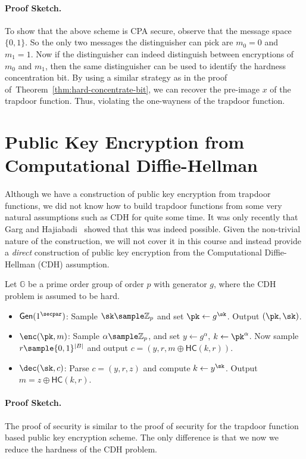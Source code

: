 \paragraph{Proof Sketch.} To show that the above scheme is CPA secure, observe that the message space $\{0,1\}$. So the only two messages the distinguisher can pick are $m_0=0$ and $m_1=1$. Now if the distinguisher can indeed distinguish between encryptions of $m_0$ and $m_1$, then the same distinguisher can be used to identify the hardness concentration bit. By using a similar strategy as in the proof of~Theorem~\ref{thm:hard-concentrate-bit}, we can recover the pre-image $x$ of the trapdoor function. Thus, violating the one-wayness of the trapdoor function.

\section{Public Key Encryption from Computational Diffie-Hellman}
Although we have a construction of public key encryption from trapdoor functions, we did not know how to build trapdoor functions from some very natural assumptions such as CDH for quite some time. It was only recently that Garg and Hajiabadi~\cite{C:GarHaj18} showed that this was indeed possible. Given the non-trivial nature of the construction, we will not cover it in this course and instead provide a \emph{direct} construction of public key encryption from the Computational Diffie-Hellman (CDH) assumption.

Let $\mathbb{G}$ be a prime order group of order $p$ with generator $g$, where the CDH problem is assumed to be hard.
\begin{itemize}
    \item $\gen(1^\secpar)$: Sample $\sk \sample \mathbb{Z}_p$ and set $\pk \gets g^\sk$. Output $(\pk, \sk)$.
    \item $\enc(\pk, m)$: Sample $\alpha \sample \mathbb{Z}_p$, and set $y \gets g^\alpha$, $k \gets \pk^\alpha$. Now sample $r \sample \{0,1\}^{|B|}$ and output $c = (y, r, m \oplus \mathsf{HC}(k, r))$.
    \item $\dec(\sk, c)$: Parse $c = (y, r, z)$ and compute $k \gets y^\sk$. Output $m = z \oplus \mathsf{HC}(k, r)$.
\end{itemize}

\paragraph{Proof Sketch.} The proof of security is similar to the proof of security for the trapdoor function based public key encryption scheme. The only difference is that we now we reduce the hardness of the CDH problem.


